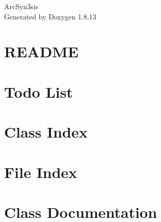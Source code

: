 \documentclass[twoside]{book}
\newcommand{\+}{\discretionary{\mbox{\scriptsize$\hookleftarrow$}}{}{}}
\newcommand{\clearemptydoublepage}{%
  \newpage{\pagestyle{empty}\cleardoublepage}%
}
\begin{document}
\hypersetup{pageanchor=false,
             bookmarksnumbered=true,
             pdfencoding=unicode
            }
\begin{titlepage}
\vspace*{7cm}
\begin{center}%
{\Large Arc\+Syn3sis }\\
\vspace*{1cm}
{\large Generated by Doxygen 1.8.13}\\
\end{center}
\end{titlepage}
\clearemptydoublepage
{}
\tableofcontents
\clearemptydoublepage
{}
\hypersetup{pageanchor=true}

\chapter{R\+E\+A\+D\+ME}
\label{md__r_e_a_d_m_e}

\chapter{Todo List}
\label{todo}

\chapter{Class Index}

\chapter{File Index}

\chapter{Class Documentation}

































\end{document}
